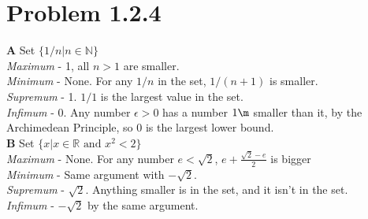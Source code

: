 \documentclass[10pt]{article} %
\begin{document}
\section{Problem 1.2.4}
\textbf{A} Set $\{1/n | n \in \mathbb{N}\}$\\
\textit{Maximum} - 1, all $n > 1$ are smaller.\\
\textit{Minimum} - None. For any $1/n$ in the set, $1/(n+1)$ is smaller.\\
\textit{Supremum} - 1. $1/1$ is the largest value in the set.\\
\textit{Infimum} - 0. Any number $\epsilon > 0$ has a number $1\m$ smaller than it, by the Archimedean Principle, so 0 is the largest lower bound.\\

\textbf{B} Set $\{x | x \in \mathbb{R} \mbox{ and } x^2 < 2\}$\\
\textit{Maximum} - None. For any number $e < \sqrt{2}$, $e + \frac{\sqrt{2}-e}{2}$ is bigger\\
\textit{Minimum} - Same argument with $-\sqrt{2}$.\\
\textit{Supremum} - $\sqrt{2}$. Anything smaller is in the set, and it isn't in the set.\\
\textit{Infimum} - $-\sqrt{2}$ by the same argument.\\
\end{document}
